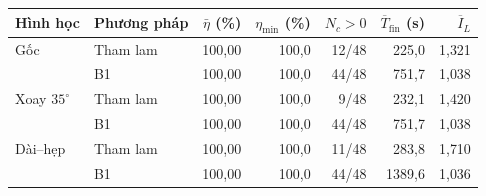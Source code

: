 \begin{tabular}{@{}llrrrrr@{}}
\toprule
Hình học & Phương pháp & $\bar\eta$ (\%) & $\eta_{\min}$ (\%) & $N_c>0$ & $\overline T_{\mathrm{fin}}$ (s) & $\overline I_L$ \\
\midrule
Gốc             & Tham lam & 100{,}00 & 100{,}0 & 12/48 & 225{,}0  & 1{,}321 \\
                & B1     & 100{,}00 & 100{,}0 & 44/48 & 751{,}7  & 1{,}038 \\
Xoay $35^\circ$ & Tham lam & 100{,}00 & 100{,}0 & 9/48  & 232{,}1  & 1{,}420 \\
                & B1     & 100{,}00 & 100{,}0 & 44/48 & 751{,}7  & 1{,}038 \\
Dài--hẹp        & Tham lam & 100{,}00 & 100{,}0 & 11/48 & 283{,}8  & 1{,}710 \\
                & B1     & 100{,}00 & 100{,}0 & 44/48 & 1389{,}6 & 1{,}036 \\
\bottomrule
\end{tabular}
